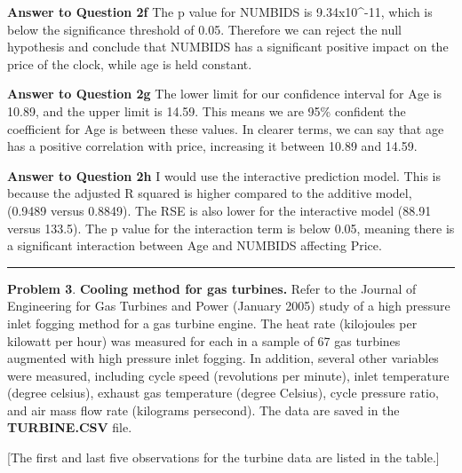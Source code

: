 \documentclass[
]{article}
\begin{document}
\textbf{Answer to Question 2f} The p value for NUMBIDS is
9.34x10\^{}-11, which is below the significance threshold of 0.05.
Therefore we can reject the null hypothesis and conclude that NUMBIDS
has a significant positive impact on the price of the clock, while age
is held constant.

\textbf{Answer to Question 2g} The lower limit for our confidence
interval for Age is 10.89, and the upper limit is 14.59. This means we
are 95\% confident the coefficient for Age is between these values. In
clearer terms, we can say that age has a positive correlation with
price, increasing it between 10.89 and 14.59.

\textbf{Answer to Question 2h} I would use the interactive prediction
model. This is because the adjusted R squared is higher compared to the
additive model, (0.9489 versus 0.8849). The RSE is also lower for the
interactive model (88.91 versus 133.5). The p value for the interaction
term is below 0.05, meaning there is a significant interaction between
Age and NUMBIDS affecting Price.

\begin{center}\rule{0.5\linewidth}{0.5pt}\end{center}

\textbf{Problem 3}. \textbf{Cooling method for gas turbines.} Refer to
the Journal of Engineering for Gas Turbines and Power (January 2005)
study of a high pressure inlet fogging method for a gas turbine engine.
The heat rate (kilojoules per kilowatt per hour) was measured for each
in a sample of 67 gas turbines augmented with high pressure inlet
fogging. In addition, several other variables were measured, including
cycle speed (revolutions per minute), inlet temperature (degree
celsius), exhaust gas temperature (degree Celsius), cycle pressure
ratio, and air mass flow rate (kilograms persecond). The data are saved
in the \textbf{TURBINE.CSV} file.

{[}The first and last five observations for the turbine data are listed
in the table.{]}
\end{document}
